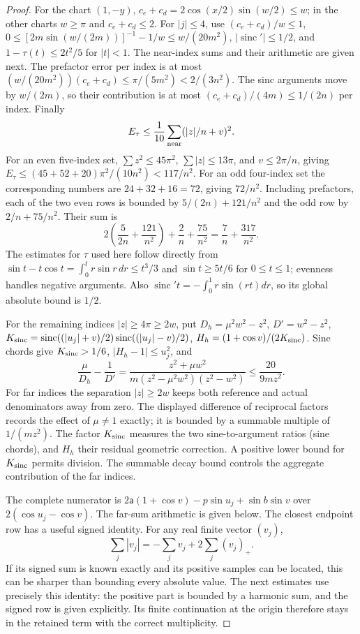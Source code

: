\begin{proof}
For the chart $(1,-y)$, $c_e+c_d=2\cos(x/2)\sin(w/2)\leq w$;
in the other charts $w\geq\pi$ and $c_e+c_d\leq2$.
For $|j|\leq4$, use $(c_e+c_d)/w\leq1$,
$0\leq[2m\sin(w/(2m))]^{-1}-1/w\leq w/(20m^2)$,
$|\operatorname{sinc}'|\leq1/2$, and $1-\tau(t)\leq2t^2/5$
for $|t|<1$. The near-index sums and their arithmetic are given next. The prefactor
error per index is at most
$(w/(20m^2))(c_e+c_d)\leq\pi/(5m^2)<2/(3n^2)$.
The sinc arguments move by $w/(2m)$, so their contribution is at
most $(c_e+c_d)/(4m)\leq1/(2n)$ per index. Finally
\[
 E_\tau\leq\frac1{10}\sum_{\rm near}(|z|/n+v)^2.
\]
For an even five-index set, $\sum z^2\leq45\pi^2$,
$\sum|z|\leq13\pi$, and $v\leq2\pi/n$, giving
$E_\tau\leq(45+52+20)\pi^2/(10n^2)<117/n^2$.
For an odd four-index set the corresponding numbers are
$24+32+16=72$, giving $72/n^2$. Including prefactors, each of the
two even rows is bounded by $5/(2n)+121/n^2$ and the odd row by
$2/n+75/n^2$. Their sum is
\[
 2\left(\frac5{2n}+\frac{121}{n^2}\right)
       +\frac2n+\frac{75}{n^2}=\frac7n+\frac{317}{n^2}.
\]
The estimates for $\tau$ used here follow directly from
$\sin t-t\cos t=\int_0^t r\sin r\,dr\leq t^3/3$ and
$\sin t\geq5t/6$ for $0\leq t\leq1$; evenness handles negative
arguments. Also $\operatorname{sinc}'t=-\int_0^1r\sin(rt)dr$,
so its global absolute bound is $1/2$.

For the remaining indices $|z|\geq4\pi\geq2w$, put
$D_h=\mu^2w^2-z^2$, $D'=w^2-z^2$,
$K_{\rm sinc}=\operatorname{sinc}((|u_j|+v)/2)\operatorname{sinc}((|u_j|-v)/2)$,
$H_h=(1+\cos v)/(2K_{\rm sinc})$. Sine chords give $K_{\rm sinc}>1/6$,
$|H_h-1|\leq u_j^2$, and
\[
 \frac\mu{D_h}-\frac1{D'}
 =\frac{z^2+\mu w^2}{m(z^2-\mu^2w^2)(z^2-w^2)}
 \leq\frac{20}{9mz^2}.
\]
For far indices the separation $|z|\geq2w$ keeps both reference
and actual denominators away from zero. The displayed difference of
reciprocal factors records the effect of $\mu\ne1$ exactly; it is
bounded by a summable multiple of $1/(mz^2)$. The factor $K_{\rm sinc}$ measures
the two sine-to-argument ratios (sine chords), and $H_h$ their residual geometric correction.
A positive lower bound for $K_{\rm sinc}$ permits division. The summable decay
bound controls the aggregate contribution of the far indices.

The complete numerator is
$2\mathsf{a}(1+\cos v)-p\sin u_j+\sin b\sin v$ over
$2(\cos u_j-\cos v)$. The far-sum arithmetic is given below.
The closest endpoint row has a useful signed identity. For any real
finite vector $(v_j)$,
\[
 \sum_j|v_j|=-\sum_jv_j+2\sum_j(v_j)_+.
\]
If its signed sum is known exactly and its positive samples can be
located, this can be sharper than bounding every absolute value.
The next estimates use precisely this identity: the positive part is
bounded by a harmonic sum, and the signed row is given explicitly.
Its finite continuation at the origin therefore stays in the retained
term with the correct multiplicity.


\end{proof}
